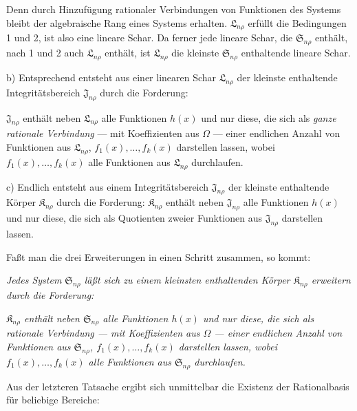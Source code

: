 \documentclass[11pt]{article}
\providecommand{\Kfield}{\mathfrak{K}}
\providecommand{\Ssys}{\mathfrak{S}}
\providecommand{\Jdom}{\mathfrak{J}}
\providecommand{\Lsys}{\mathfrak{L}}
\begin{document}
Denn durch Hinzufügung rationaler Verbindungen von Funktionen des Systems bleibt der algebraische Rang eines Systems erhalten. $\Lsys_{n\rho}$ erfüllt die Bedingungen 1 und 2, ist also eine lineare Schar. Da ferner jede lineare Schar, die $\Ssys_{n\rho}$ enthält, nach 1 und 2 auch $\Lsys_{n\rho}$ enthält, ist $\Lsys_{n\rho}$ die kleinste $\Ssys_{n\rho}$ enthaltende lineare Schar.

b) Entsprechend entsteht aus einer linearen Schar $\Lsys_{n\rho}$ der kleinste enthaltende Integritätsbereich $\Jdom_{n\rho}$ durch die Forderung:

$\Jdom_{n\rho}$ enthält neben $\Lsys_{n\rho}$ alle Funktionen $h(x)$ und nur diese, die sich als \emph{ganze rationale Verbindung} --- mit Koeffizienten aus $\Omega$ --- einer endlichen Anzahl von Funktionen aus $\Lsys_{n\rho}$, $f_1(x),\ldots,f_k(x)$ darstellen lassen, wobei $f_1(x),\ldots,f_k(x)$ alle Funktionen aus $\Lsys_{n\rho}$ durchlaufen.

c) Endlich entsteht aus einem Integritätsbereich $\Jdom_{n\rho}$ der kleinste enthaltende Körper $\Kfield_{n\rho}$ durch die Forderung: $\Kfield_{n\rho}$ enthält neben $\Jdom_{n\rho}$ alle Funktionen $h(x)$ und nur diese, die sich als Quotienten zweier Funktionen aus $\Jdom_{n\rho}$ darstellen lassen.

Faßt man die drei Erweiterungen in einen Schritt zusammen, so kommt:

\emph{Jedes System $\Ssys_{n\rho}$ läßt sich zu einem kleinsten enthaltenden Körper $\Kfield_{n\rho}$ erweitern durch die Forderung:}

\emph{$\Kfield_{n\rho}$ enthält neben $\Ssys_{n\rho}$ alle Funktionen $h(x)$ und nur diese, die sich als rationale Verbindung --- mit Koeffizienten aus $\Omega$ --- einer endlichen Anzahl von Funktionen aus $\Ssys_{n\rho}$, $f_1(x),\ldots,f_k(x)$ darstellen lassen, wobei $f_1(x),\ldots,f_k(x)$ alle Funktionen aus $\Ssys_{n\rho}$ durchlaufen.}

Aus der letzteren Tatsache ergibt sich unmittelbar die Existenz der Rationalbasis für beliebige Bereiche:
\end{document}
